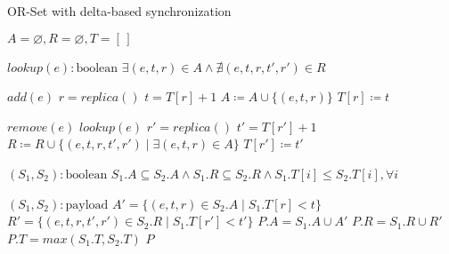 \begin{algorithm}[t]
\small{
	\caption{OR-Set with delta-based synchronization}
 	\label{alg:or_set_with_deltas}                       

 	\begin{algorithmic}[1]
 	  \State \Payload $A = \varnothing, R = \varnothing, T = [\,]$
 	  
 	  \State \Query $lookup(e) : \text{boolean}$
 	  \State \hspace{\algorithmicindent} \Return $\exists (e, t, r) \in A \land \nexists (e, t, r, t', r') \in R$
 	  
 	  \State \Update $add(e)$
 	  \State \hspace{\algorithmicindent} \Let $r = replica()$
 	  \State \hspace{\algorithmicindent} \Let $t = T[r] + 1$
 	  \State \hspace{\algorithmicindent} $A \coloneqq A \cup \{(e, t, r)\}$
 	  \State \hspace{\algorithmicindent} $T[r] \coloneqq  t$

 	  \State \Update $remove(e)$
 	  \State \hspace{\algorithmicindent} \Pre $lookup(e)$
 	  \State \hspace{\algorithmicindent} \Let $r' = replica()$
 	  \State \hspace{\algorithmicindent} \Let $t' = T[r'] + 1$
 	  \State \hspace{\algorithmicindent} $R \coloneqq R \cup \{(e, t, r, t', r') \mid \exists (e, t, r) \in A\}$
 	  \State \hspace{\algorithmicindent} $T[r'] \coloneqq  t'$

 	  \State \Compare $(S_{1}, S_{2}) : \text{boolean}$
 	  \State \hspace{\algorithmicindent} \Return $S_{1}.A \subseteq S_{2}.A \land S_{1}.R \subseteq S_{2}.R \land S_{1}.T[i] \leq S_{2}.T[i], \forall i$

 	  \State \Merge $(S_{1}, S_{2}) : \text{payload}$
 	  \State \hspace{\algorithmicindent} \Let $A' = \{(e, t, r) \in S_{2}.A \mid S_{1}.T[r] < t\}$
 	  \State \hspace{\algorithmicindent} \Let $R' = \{(e, t, r, t', r') \in S_{2}.R \mid S_{1}.T[r'] < t'\}$
 	  \State \hspace{\algorithmicindent} \Let $P.A = S_{1}.A \cup A'$
 	  \State \hspace{\algorithmicindent} \Let $P.R = S_{1}.R \cup R'$
 	  \State \hspace{\algorithmicindent} \Let $P.T = max(S_{1}.T, S_{2}.T)$
 	  \State \hspace{\algorithmicindent} \Return $P$
	\end{algorithmic}
 }
\end{algorithm}

